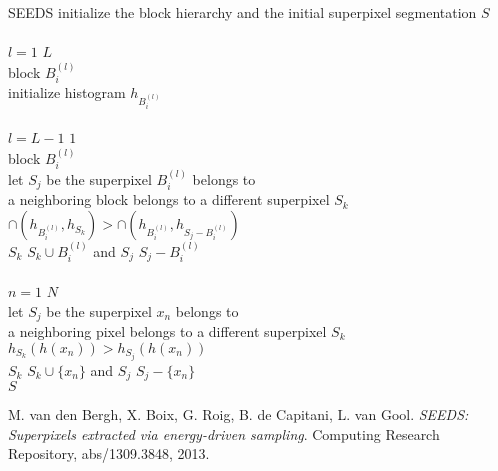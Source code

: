 \documentclass[12pt,a4paper]{article}
\begin{document}
	\begin{algorithm}[t]
		\begin{algo}{SEEDS}{\label{algo:superpixel-segmentation-seeds}}
			initialize the block hierarchy and the initial superpixel segmentation $S$\\
			\\
			\qfor $l = 1$ \qto $L$\\
				\qforeach block $B_i^{(l)}$ \\
					initialize histogram $h_{B_i^{(l)}}$\qrof\qrof\\
			\\
			\qfor $l = L - 1$ \qto $1$\\
				\qforeach block $B_i^{(l)}$\\
					let $S_j$ be the superpixel $B_i^{(l)}$ belongs to\\
					\qif a neighboring block belongs to a different superpixel $S_k$\\
						\qthen \qif $\cap(h_{B_i^{(l)}}, h_{S_k}) > \cap(h_{B_i^{(l)}}, h_{S_j - B_i^{(l)}})$\\
							\qthen $S_k$ \qlet $S_k \cup B_i^{(l)}$ and $S_j$ \qlet $S_j - B_i^{(l)}$\qfi\qfi\qrof\qrof\\
			\\
			\qfor $n = 1$ \qto $N$\\
				let $S_j$ be the superpixel $x_n$ belongs to\\
				\qif a neighboring pixel belongs to a different superpixel $S_k$\\
					\qthen\qif $h_{S_k}(h(x_n)) > h_{S_j}(h(x_n))$\label{line:superpixel-segmentation-seeds-pixel-criterion}\\
						\qthen $S_k$ \qlet $S_k \cup \{x_n\}$ and $S_j$ \qlet $S_j - \{x_n\}$\qfi\qfi\qrof\\
			\qreturn $S$
		\end{algo}
		\caption[The basic algorithm of \textbf{SEEDS} \cite{VanDenBerghBoixRoigCapitaniVanGool}.]{The basic algorithm of \textbf{SEEDS}.}
		\label{fig:superpixel-segmentation-seeds-algorithm}
	\end{algorithm}

	\begin{thebibliography}{1}
		M. van den Bergh, X. Boix, G. Roig, B. de Capitani, L. van Gool.
		\emph{SEEDS: Superpixels extracted via energy-driven sampling}.
		Computing Research Repository, abs/1309.3848, 2013.
	\end{thebibliography}
\end{document}
